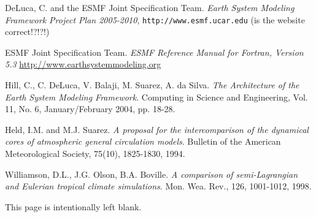 \cleardoublepage
{}
{}
\begin{thebibliography}{56}

  DeLuca, C. and the ESMF Joint Specification Team.
  \emph{Earth System Modeling Framework Project Plan 2005-2010},
  \texttt{http://www.esmf.ucar.edu} (is the website correct!?!?!)

  ESMF Joint Specification Team.
  \emph{ESMF Reference Manual for Fortran, Version 5.3}
  \href{http://www.earthsystemmodeling.org}{http://www.earthsystemmodeling.org}

  Hill, C., C. DeLuca, V. Balaji, M. Suarez, A. da Silva.
  \emph{The Architecture of the Earth System Modeling Framework}.
  Computing in Science and Engineering, Vol. 11, No. 6, January/February 2004,
  pp. 18-28.

  Held, I.M. and M.J. Suarez.
  \emph{A proposal for the intercomparison of the dynamical cores of
    atmospheric general circulation models}.
  Bulletin of the American Meteorological Society, 75(10), 1825-1830, 1994.

  Williamson, D.L., J.G. Olson, B.A. Boville.
  \emph{A comparison of semi-Lagrangian and Eulerian tropical climate
    simulations}.
  Mon. Wea. Rev., 126, 1001-1012, 1998.

\end{thebibliography}

\cleardoublepage
{}
{}
\printindex

\clearpage
This page is intentionally left blank.

